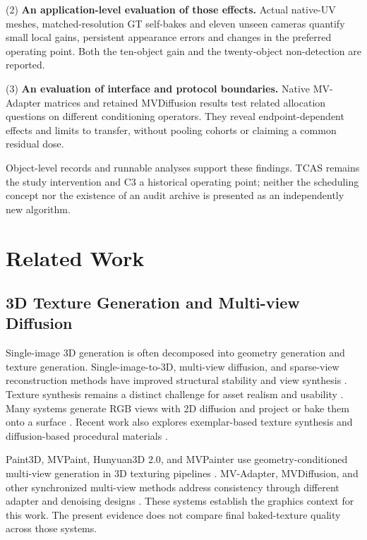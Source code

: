 \documentclass[times,twocolumn,final]{elsarticle}
\begin{document}
(2) \textbf{An application-level evaluation of those effects.} Actual native-UV meshes, matched-resolution GT self-bakes and eleven unseen cameras quantify small local gains, persistent appearance errors and changes in the preferred operating point. Both the ten-object gain and the twenty-object non-detection are reported.

(3) \textbf{An evaluation of interface and protocol boundaries.} Native MV-Adapter matrices and retained MVDiffusion results test related allocation questions on different conditioning operators. They reveal endpoint-dependent effects and limits to transfer, without pooling cohorts or claiming a common residual dose.

Object-level records and runnable analyses support these findings. TCAS remains the study intervention and C3 a historical operating point; neither the scheduling concept nor the existence of an audit archive is presented as an independently new algorithm.

\section{Related Work}
\label{sec:related}

\subsection{3D Texture Generation and Multi-view Diffusion}
\label{subsec:3dtex}

Single-image 3D generation is often decomposed into geometry generation and texture generation. Single-image-to-3D, multi-view diffusion, and sparse-view reconstruction methods have improved structural stability and view synthesis \cite{liu2023zero1to3,shi2023zero123pp,liu2023syncdreamer,long2023wonder3d,shi2024mvdream,wang2023imagedream,xu2024instantmesh,ke2024era3d}. Texture synthesis remains a distinct challenge for asset realism and usability \cite{perla2026survey}. Many systems generate RGB views with 2D diffusion and project or bake them onto a surface \cite{chen2023text2tex,richardson2023texture,poole2023dreamfusion,chen2023fantasia3d}. Recent work also explores exemplar-based texture synthesis and diffusion-based procedural materials \cite{guzman2026adaptive,lv2025interpretable}.

Paint3D, MVPaint, Hunyuan3D 2.0, and MVPainter use geometry-conditioned multi-view generation in 3D texturing pipelines \cite{zeng2024paint3d,cheng2024mvpaint,lai2025hunyuan3d,shao2025mvpainter}. MV-Adapter, MVDiffusion, and other synchronized multi-view methods address consistency through different adapter and denoising designs \cite{huang2024mvadapter,tang2023mvdiffusion,liu2024synchronized,xu2026wondertex}. These systems establish the graphics context for this work. The present evidence does not compare final baked-texture quality across those systems.
\end{document}
